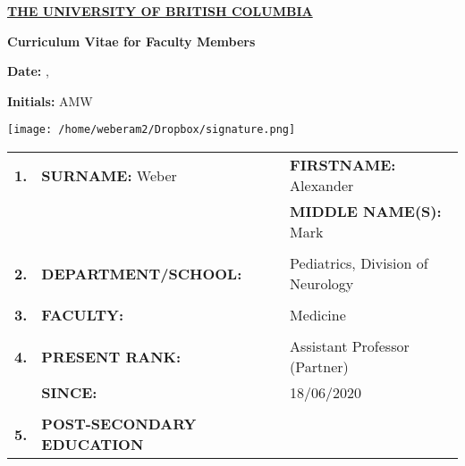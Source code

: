 \documentclass[11pt,notitlepage,english]{report}
\makeatletter
\newcommand{\monthyeardate}{%
  \DTMenglishmonthname{\@dtm@month}, \@dtm@year
}
\makeatother
\begin{document}
\begin{center}
  \underline{\textbf{THE UNIVERSITY OF BRITISH COLUMBIA}}
  \vspace{10pt}

  \textbf{Curriculum Vitae for Faculty Members}
\end{center}

\noindent %
\begin{minipage}[t]{0.33\textwidth}
  \raggedright
  \textbf{Date:} \monthyeardate
\end{minipage}%
\begin{minipage}[t]{0.33\textwidth}
  \begin{center}
    \textbf{Initials:} AMW \hspace{10pt} 
  \end{center}
\end{minipage}%
\begin{minipage}[t]{0.33\textwidth}
  \raggedleft
  \texttt{[image: /home/weberam2/Dropbox/signature.png]}
\end{minipage}

\vspace{15pt}

\begin{tabular}{L{.5cm} L{8cm} L{6.9cm}}
  \textbf{1.} & \textbf{SURNAME:} Weber                       & \textbf{FIRSTNAME:} Alexander      \\
              &                                               & \textbf{MIDDLE NAME(S):} Mark      \\
              \\
  \textbf{2.} & \textbf{DEPARTMENT/SCHOOL:}                   & Pediatrics, Division of Neurology \\
  \\
  \textbf{3.} & \textbf{FACULTY:}                             & Medicine                           \\
  \\
  \textbf{4.} & \textbf{PRESENT RANK:}                        & Assistant Professor (Partner)      \\
              & \textbf{SINCE:}                               & 18/06/2020                         \\
              \\
  \textbf{5.} & \textbf{POST-SECONDARY EDUCATION}
\end{tabular}
\end{document}
